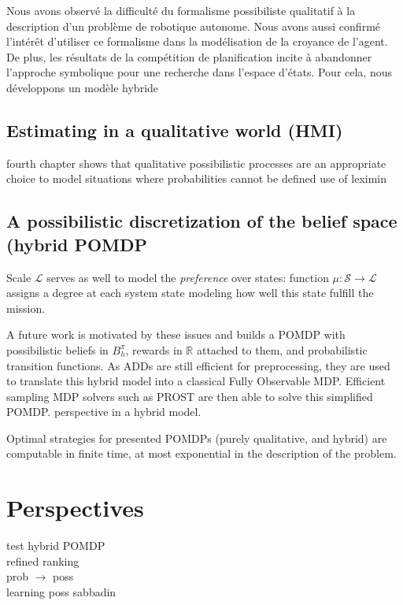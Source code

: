 Nous avons observ\'e la difficult\'e du formalisme possibiliste qualitatif \`a la
description d'un probl\`eme de robotique autonome. Nous avons aussi confirm\'e
l'int\'er\^et d'utiliser ce formalisme dans la mod\'elisation de la croyance de l'agent.
De plus, les r\'esultats de la comp\'etition de planification incite \`a abandonner l'approche symbolique pour
une recherche dans l'espace d'\'etats. Pour cela, nous d\'eveloppons un mod\`ele hybride

\subsection*{Estimating in a qualitative world (HMI)}
fourth chapter shows that 
qualitative possibilistic processes
are an appropriate choice
to model situations 
where probabilities 
cannot be defined
use of leximin

\subsection*{A possibilistic discretization of the belief space (hybrid POMDP}
Scale $\mathcal{L}$ serves as well to model 
the \emph{preference} over states: 
function $\mu: \mathcal{S} \rightarrow \mathcal{L}$ assigns a degree
at each system state modeling how well this state fulfill the mission. 


A future work is motivated by these issues
and builds a POMDP with possibilistic beliefs in $B_h^{\pi}$,
rewards in $\mathbb{R}$ attached to them,
and probabilistic transition functions.
As ADDs are still efficient for preprocessing,
they are used to translate this hybrid
model into a classical Fully Observable MDP.
Efficient sampling MDP solvers such as PROST 
are then able to solve this simplified POMDP. 
perspective in a hybrid model.


Optimal strategies for presented POMDPs (purely qualitative, and hybrid)
are computable in finite time, at most exponential in the description of the problem.


\section*{Perspectives}
test hybrid POMDP\\
refined ranking\\
prob $\rightarrow$ poss\\
learning poss sabbadin\\


